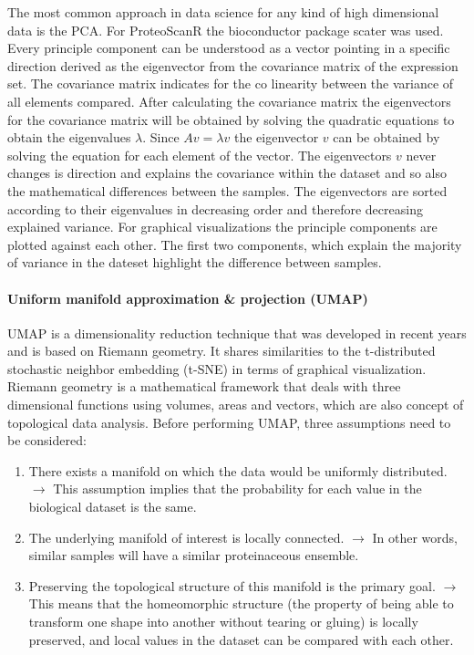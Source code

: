 \documentclass[
  11pt,
]{article}
\begin{document}
The most common approach in data science for any kind of high
dimensional data is the PCA. For ProteoScanR the bioconductor package
scater \citep{McCarthy2017} was used. Every principle component can be
understood as a vector pointing in a specific direction derived as the
eigenvector from the covariance matrix of the expression set. The
covariance matrix indicates for the co linearity between the variance of
all elements compared. After calculating the covariance matrix the
eigenvectors for the covariance matrix will be obtained by solving the
quadratic equations to obtain the eigenvalues \(\lambda\). Since
\(A v = \lambda v\) the eigenvector \(v\) can be obtained by solving the
equation for each element of the vector. The eigenvectors \(v\) never
changes is direction and explains the covariance within the dataset and
so also the mathematical differences between the samples. The
eigenvectors are sorted according to their eigenvalues in decreasing
order and therefore decreasing explained variance. For graphical
visualizations the principle components are plotted against each other.
The first two components, which explain the majority of variance in the
dateset highlight the difference between samples.

\hypertarget{uniform-manifold-approximation-projection-umap}{%
\paragraph{Uniform manifold approximation \& projection
(UMAP)}\label{uniform-manifold-approximation-projection-umap}}

UMAP \citep{McInnes2018} is a dimensionality reduction technique that
was developed in recent years and is based on Riemann geometry. It
shares similarities to the t-distributed stochastic neighbor embedding
(t-SNE) in terms of graphical visualization. Riemann geometry is a
mathematical framework that deals with three dimensional functions using
volumes, areas and vectors, which are also concept of topological data
analysis. Before performing UMAP, three assumptions need to be
considered:

\begin{enumerate}
\item There exists a manifold on which the data would be uniformly distributed.
$\rightarrow$ This assumption implies that the probability for each value in the biological dataset is the same.

\item The underlying manifold of interest is locally connected.
$\rightarrow$ In other words, similar samples will have a similar proteinaceous ensemble.

\item Preserving the topological structure of this manifold is the primary
goal.
$\rightarrow$ This means that the homeomorphic structure (the property of being able to transform one shape into another without tearing or gluing) is locally preserved, and local values in the dataset can be compared with each other.
\end{enumerate}
\end{document}
